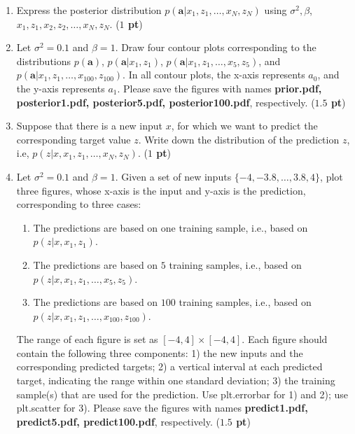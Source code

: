 \documentclass[twoside]{article}
\begin{document}
\begin{enumerate}
\item Express the posterior distribution $p(\mathbf{a}|x_1,z_1,\ldots,x_N,z_N)$ using $\sigma^2, \beta$, $x_1, z_1, x_2, z_2, \ldots, x_N, z_N$.
   ({\bf $1$ pt})

      \begin{center}
   \end{center}
\item Let $\sigma^2=0.1$ and $\beta=1$. Draw four contour plots corresponding to the distributions $p(\mathbf{a})$, $p(\mathbf{a}|x_1,z_1)$, $p(\mathbf{a}|x_1,z_1,\ldots,x_{5},z_{5})$, and $p(\mathbf{a}|x_1,z_1,\ldots,x_{100},z_{100})$. In all contour plots, the x-axis represents $a_0$, and the y-axis represents $a_1$. Please save the figures with names \textbf{prior.pdf, posterior1.pdf, posterior5.pdf, posterior100.pdf}, respectively. ({\bf $1.5$ pt})

\item Suppose that there is a new input $x$, for which we want to predict the corresponding target value $z$. Write down the distribution of the prediction $z$, i.e, $p(z|x,x_1,z_1,\ldots,x_N,z_N)$. ({\bf $1$ pt})
     \begin{center}
   \end{center}


\item Let $\sigma^2=0.1$ and $\beta=1$. Given a set of new inputs $\{-4,-3.8,\ldots,3.8,4\}$, plot three figures, whose x-axis is the input and y-axis is the prediction, corresponding to three cases:
    \begin{enumerate}
    \item The predictions are based on one training sample, i.e., based on $p(z|x,x_1,z_1)$.
    \item The predictions are based on $5$ training samples, i.e., based on $p(z|x,x_1,z_1,\ldots,x_{5},z_{5})$.
    \item The predictions are based on $100$ training samples, i.e., based on $p(z|x,x_1,z_1,\ldots,x_{100},z_{100})$.
    \end{enumerate}

     The range of each figure is set as $[-4, 4]\times [-4, 4]$. Each figure should contain the following three components: 1) the new inputs and the corresponding predicted targets; 2) a vertical interval at each predicted target, indicating the range within one standard deviation; 3) the training sample(s) that are used for the prediction. Use \textsf{plt.errorbar} for 1) and 2); use \textsf{plt.scatter} for 3). Please save the figures with names \textbf{predict1.pdf, predict5.pdf, predict100.pdf}, respectively. ({\bf $1.5$ pt})

\end{enumerate}
\end{document}
